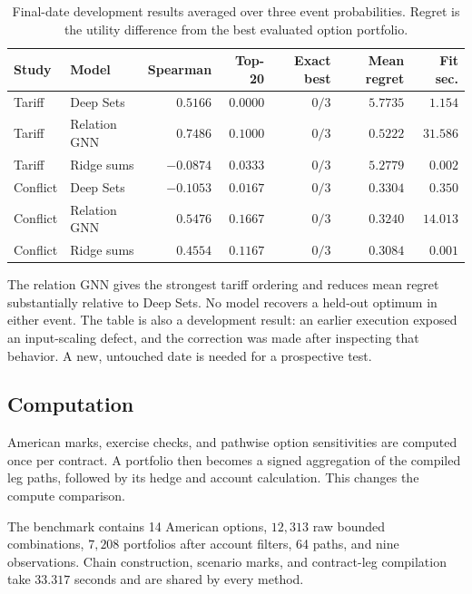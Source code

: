 \documentclass{strategynet-journal}
\begin{document}
\begin{table}[H]
\centering
\small
\begin{tabular}{@{}llrrrrr@{}}
\toprule
Study & Model & Spearman & Top-20 & Exact best & Mean regret & Fit sec. \\
\midrule
Tariff & Deep Sets & \(0.5166\) & \(0.0000\) & \(0/3\) & \(5.7735\) & \(1.154\) \\
Tariff & Relation GNN & \(0.7486\) & \(0.1000\) & \(0/3\) & \(0.5222\) & \(31.586\) \\
Tariff & Ridge sums & \(-0.0874\) & \(0.0333\) & \(0/3\) & \(5.2779\) & \(0.002\) \\
\addlinespace
Conflict & Deep Sets & \(-0.1053\) & \(0.0167\) & \(0/3\) & \(0.3304\) & \(0.350\) \\
Conflict & Relation GNN & \(0.5476\) & \(0.1667\) & \(0/3\) & \(0.3240\) & \(14.013\) \\
Conflict & Ridge sums & \(0.4554\) & \(0.1167\) & \(0/3\) & \(0.3084\) & \(0.001\) \\
\bottomrule
\end{tabular}
\caption{Final-date development results averaged over three event
probabilities.  Regret is the utility difference from the best evaluated
option portfolio.}
\label{tab:chronological}
\end{table}

The relation GNN gives the strongest tariff ordering and reduces mean regret
substantially relative to Deep Sets.  No model recovers a held-out optimum in
either event.  The table is also a development result: an earlier execution
exposed an input-scaling defect, and the correction was made after inspecting
that behavior.  A new, untouched date is needed for a prospective test.

\subsection{Computation}

American marks, exercise checks, and pathwise option sensitivities are
computed once per contract.  A portfolio then becomes a signed aggregation
of the compiled leg paths, followed by its hedge and account calculation.
This changes the compute comparison.

The benchmark contains 14 American options, \(12{,}313\) raw bounded
combinations, \(7{,}208\) portfolios after account filters, 64 paths, and nine
observations.  Chain construction, scenario marks, and contract-leg
compilation take \(33.317\) seconds and are shared by every method.
\end{document}
